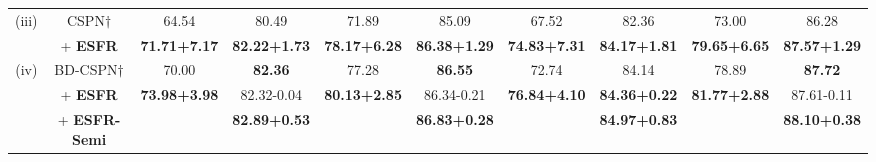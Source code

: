 \documentclass{article}
\begin{document}
\begin{table*}[t]
\begin{small}
\begin{center}
\begin{tabular}{cccccccccc}
				\multirow{2}{*}{(iii)} & CSPN$\dagger$ & 64.54 & 80.49 & 71.89 & 85.09 & 67.52 & 82.36 & 73.00 & 86.28 \\
				&\cellcolor[HTML]{EFEFEF} + \textbf{ESFR} &\cellcolor[HTML]{EFEFEF} \textbf{71.71{\scriptsize+7.17}} &\cellcolor[HTML]{EFEFEF} \textbf{82.22{\scriptsize+1.73}} &\cellcolor[HTML]{EFEFEF} \textbf{78.17{\scriptsize+6.28}} &\cellcolor[HTML]{EFEFEF} \textbf{86.38{\scriptsize+1.29}} &\cellcolor[HTML]{EFEFEF} \textbf{74.83{\scriptsize+7.31}} &\cellcolor[HTML]{EFEFEF} \textbf{84.17{\scriptsize+1.81}} &\cellcolor[HTML]{EFEFEF} \textbf{79.65{\scriptsize+6.65}} &\cellcolor[HTML]{EFEFEF} \textbf{87.57{\scriptsize+1.29}} \\ \hline
				\multirow{3}{*}{(iv)} & BD-CSPN$\dagger$ & 70.00 & \textbf{82.36} & 77.28 & \textbf{86.55} & 72.74 & 84.14 & 78.89 & \textbf{87.72} \\
				& \cellcolor[HTML]{EFEFEF} + \textbf{ESFR} & \cellcolor[HTML]{EFEFEF} \textbf{73.98{\scriptsize+3.98}} & \cellcolor[HTML]{EFEFEF} 82.32{\scriptsize-0.04} & \cellcolor[HTML]{EFEFEF} \textbf{80.13{\scriptsize+2.85}} & \cellcolor[HTML]{EFEFEF} 86.34{\scriptsize-0.21} & \cellcolor[HTML]{EFEFEF} \textbf{76.84{\scriptsize+4.10}} & \cellcolor[HTML]{EFEFEF} \textbf{84.36{\scriptsize+0.22}} & \cellcolor[HTML]{EFEFEF} \textbf{81.77{\scriptsize+2.88}} & \cellcolor[HTML]{EFEFEF} 87.61{\scriptsize-0.11} \\
				& \cellcolor[HTML]{EFEFEF} + \textbf{ESFR-Semi} & \cellcolor[HTML]{EFEFEF}  & \cellcolor[HTML]{EFEFEF} \textbf{82.89{\scriptsize+0.53}} & \cellcolor[HTML]{EFEFEF}  & \cellcolor[HTML]{EFEFEF} \textbf{86.83{\scriptsize+0.28}} & \cellcolor[HTML]{EFEFEF}  & \cellcolor[HTML]{EFEFEF} \textbf{84.97{\scriptsize+0.83}} & \cellcolor[HTML]{EFEFEF}  & \cellcolor[HTML]{EFEFEF} \textbf{88.10{\scriptsize+0.38}} \\ \hline
			\end{tabular}
		\end{center}
	\end{small}
\end{table*}
\end{document}

